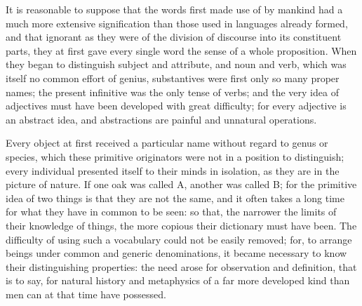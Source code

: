 \documentclass[12pt]{report}
\begin{document}
It is reasonable to suppose that the words first made use of by mankind had a much more extensive signification than those used in languages already formed, and that ignorant as they were of the division of discourse into its constituent parts, they at first gave every single word the sense of a whole proposition. When they began to distinguish subject and attribute, and noun and verb, which was itself no common effort of genius, substantives were first only so many proper names; the present infinitive was the only tense of verbs; and the very idea of adjectives must have been developed with great difficulty; for every adjective is an abstract idea, and abstractions are painful and unnatural operations.

Every object at first received a particular name without regard to genus or species, which these primitive originators were not in a position to distinguish; every individual presented itself to their minds in isolation, as they are in the picture of nature. If one oak was called A, another was called B; for the primitive idea of two things is that they are not the same, and it often takes a long time for what they have in common to be seen: so that, the narrower the limits of their knowledge of things, the more copious their dictionary must have been. The difficulty of using such a vocabulary could not be easily removed; for, to arrange beings under common and generic denominations, it became necessary to know their distinguishing properties: the need arose for observation and definition, that is to say, for natural history and metaphysics of a far more developed kind than men can at that time have possessed.
\end{document}
